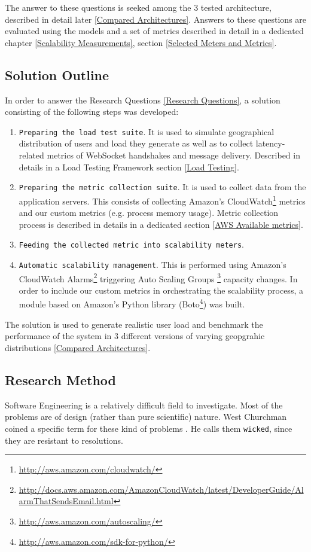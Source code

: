 \documentclass{uvamscse}
\begin{document}
The answer to these questions is seeked among the 3 tested architecture, described in detail later \ref{Compared Architectures}. Answers to these questions are evaluated using the models and a set of metrics described in detail in a dedicated chapter \ref{Scalability Measurements}, section \ref{Selected Meters and Metrics}.

\subsection{Solution Outline}

In order to answer the Research Questions \ref{Research Questions}, a solution consisting of the following steps was developed:
\begin{enumerate}
  \item \texttt{Preparing the load test suite}. It is used to simulate geographical distribution of users and load they generate as well as to collect latency-related metrics of WebSocket handshakes and message delivery. Described in details in a Load Testing Framework section \ref{Load Testing}.
  \item \texttt{Preparing the metric collection suite}. It is used to collect data from the application servers. This consists of collecting Amazon's CloudWatch\footnote{\url{http://aws.amazon.com/cloudwatch/}} metrics and our custom metrics (e.g. process memory usage). Metric collection process is described in details in a dedicated section \ref{AWS Available metrics}.
  \item \texttt{Feeding the collected metric into scalability meters}.
  \item \texttt{Automatic scalability management}. This is performed using Amazon's CloudWatch Alarms\footnote{\url{http://docs.aws.amazon.com/AmazonCloudWatch/latest/DeveloperGuide/AlarmThatSendsEmail.html}} triggering Auto Scaling Groups \footnote{\url{http://aws.amazon.com/autoscaling/}} capacity changes. In order to include our custom metrics in orchestrating the scalability process, a module based on Amazon's Python library (Boto\footnote{\url{http://aws.amazon.com/sdk-for-python/}}) was built.
\end{enumerate}

The solution is used to generate realistic user load and benchmark the performance of the system in 3 different versions of varying geopgrahic distributions \ref{Compared Architectures}.

\subsection{Research Method}\label{Research Method}
Software Engineering is a relatively difficult field to investigate. Most of the problems are of design (rather than pure scientific) nature. West Churchman coined a specific term for these kind of problems \cite{Wckd}. He calls them \texttt{wicked}, since they are resistant to resolutions.
\end{document}
